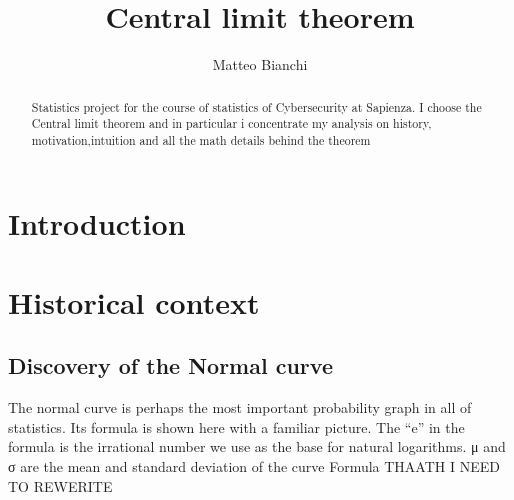 \documentclass{article}
\title{Central limit theorem}
\author{Matteo Bianchi}
\begin{document}
\maketitle

\begin{abstract}
Statistics project for the course of statistics of Cybersecurity at Sapienza.
I choose the Central limit theorem and in particular i concentrate my analysis  on  history, motivation,intuition and  all the math details behind the theorem
\end{abstract}

\section{Introduction}

\section{Historical context}
\subsection{Discovery of the Normal curve}
The normal curve is perhaps the most important probability graph in all of statistics.
Its formula is shown here with a
familiar picture. The “e” in the formula
is the irrational number we use as the
base for natural logarithms. μ and σ are
the mean and standard deviation of the
curve
Formula THAATH I NEED TO REWERITE
\end{document}
